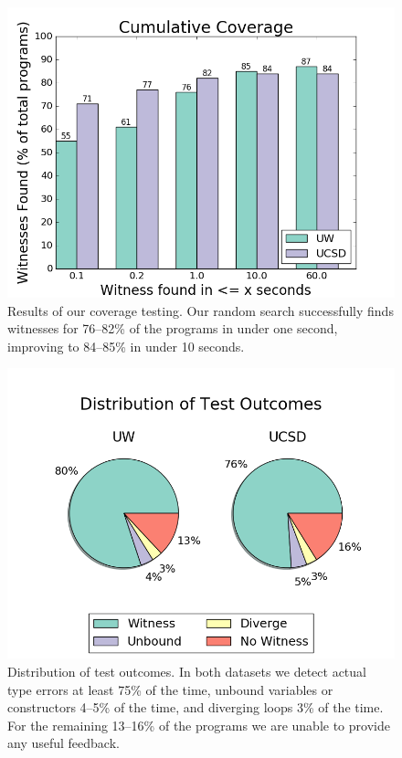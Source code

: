 \begin{figure}[t]
\centering
\includegraphics[width=0.7\linewidth]{coverage.png}
\caption{Results of our coverage testing. Our random search successfully
  finds witnesses for 76--82\% of the programs in under one second,
  improving to 84--85\% in under 10 seconds. }
\label{fig:results-witness}
\end{figure}
\begin{figure}[t]
\includegraphics[width=0.7\linewidth]{distrib.png}
\caption{Distribution of test outcomes. In both datasets we detect
  actual type errors at least 75\% of the time, unbound variables or
  constructors 4--5\% of the time, and diverging loops 3\% of the
  time. For the remaining 13--16\% of the programs we are unable to
  provide any useful feedback. }
\label{fig:results-distrib}
\end{figure}


